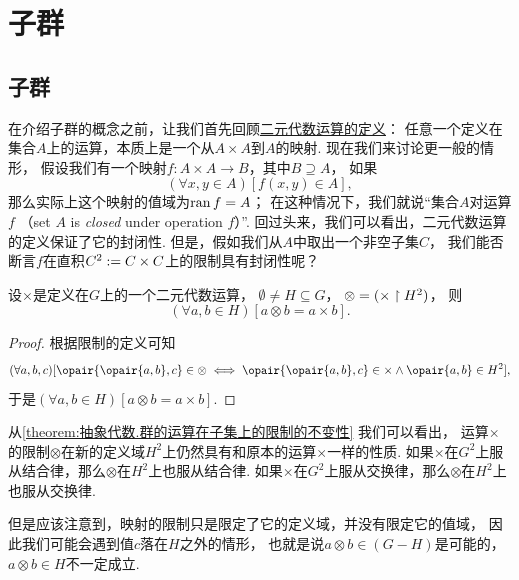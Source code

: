 \section{子群}
\subsection{子群}
在介绍子群的概念之前，让我们首先回顾\hyperref[definition:集合论.二元代数运算]{二元代数运算的定义}：
任意一个定义在集合\(A\)上的运算，本质上是一个从\(A \times A\)到\(A\)的映射.
现在我们来讨论更一般的情形，
假设我们有一个映射\(f\colon A \times A \to B\)，其中\(B \supseteq A\)，
如果\begin{equation*}
	(\forall x,y \in A)[f(x,y) \in A],
\end{equation*}
那么实际上这个映射的值域为\(\operatorname{ran} f = A\)；
在这种情况下，我们就说“集合\(A\)对运算\(f\) %
（set \(A\) is \emph{closed} under operation \(f\)）”.
回过头来，我们可以看出，二元代数运算的定义保证了它的封闭性.
但是，假如我们从\(A\)中取出一个非空子集\(C\)，
我们能否断言\(f\)在直积\(C^2 := C \times C\)上的限制具有封闭性呢？

\begin{lemma}\label{theorem:抽象代数.群的运算在子集上的限制的不变性}
设\(\times\)是定义在\(G\)上的一个二元代数运算，
\(\emptyset \neq H \subseteq G\)，
\(\otimes = (\times \upharpoonright H^2)\)，
则\begin{equation*}
	(\forall a,b \in H)[a \otimes b = a \times b].
\end{equation*}
\begin{proof}
根据限制的定义可知\begin{equation*}
	(\forall a,b,c)[
		\opair{\opair{a,b},c} \in \otimes
		\iff
		\opair{\opair{a,b},c} \in \times
		\land
		\opair{a,b} \in H^2
	],
\end{equation*}
于是\((\forall a,b \in H)[a \otimes b = a \times b]\).
\end{proof}
\end{lemma}
从\cref{theorem:抽象代数.群的运算在子集上的限制的不变性} 我们可以看出，
运算\(\times\)的限制\(\otimes\)在新的定义域\(H^2\)上仍然具有和原本的运算\(\times\)一样的性质.
如果\(\times\)在\(G^2\)上服从结合律，那么\(\otimes\)在\(H^2\)上也服从结合律.
如果\(\times\)在\(G^2\)上服从交换律，那么\(\otimes\)在\(H^2\)上也服从交换律.

但是应该注意到，映射的限制只是限定了它的定义域，并没有限定它的值域，
因此我们可能会遇到值\(c\)落在\(H\)之外的情形，
也就是说\(a \otimes b \in(G - H)\)是可能的，
\(a \otimes b \in H\)不一定成立.

